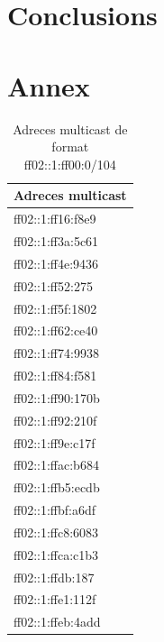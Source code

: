 \documentclass{article}
\begin{document}
\section{Conclusions}
\section{Annex}
\begin{table}[!h]
\centering
\begin{tabular}{|C{4cm}|}
\hline
Adreces multicast\\
\hline
ff02::1:ff16:f8e9\\
\hline
ff02::1:ff3a:5c61\\
\hline
ff02::1:ff4e:9436\\
\hline
ff02::1:ff52:275\\
\hline
ff02::1:ff5f:1802\\
\hline
ff02::1:ff62:ce40\\
\hline
ff02::1:ff74:9938\\
\hline
ff02::1:ff84:f581\\
\hline
ff02::1:ff90:170b\\
\hline
ff02::1:ff92:210f\\
\hline
ff02::1:ff9e:c17f\\
\hline
ff02::1:ffac:b684\\
\hline
ff02::1:ffb5:ecdb\\
\hline
ff02::1:ffbf:a6df\\
\hline
ff02::1:ffc8:6083\\
\hline
ff02::1:ffca:c1b3\\
\hline
ff02::1:ffdb:187\\
\hline
ff02::1:ffe1:112f\\
\hline
ff02::1:ffeb:4add\\
\hline
\end{tabular}
\caption{Adreces multicast de format ff02::1:ff00:0/104}
\label{mult:104}
\end{table}
\end{document}
